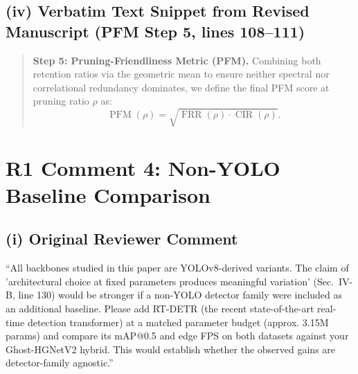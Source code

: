 \documentclass[conference]{IEEEtran}
\begin{document}
\subsection*{(iv) Verbatim Text Snippet from Revised Manuscript (PFM Step 5, lines 108--111)}
\begin{quote}
\textbf{Step 5: Pruning-Friendliness Metric (PFM).} Combining both retention ratios via the geometric mean to ensure neither spectral nor correlational redundancy dominates, we define the final PFM score at pruning ratio $\rho$ as:
\begin{equation}
\operatorname{PFM}(\rho) = \sqrt{\operatorname{FRR}(\rho) \cdot \operatorname{CIR}(\rho)}.
\end{equation}
\end{quote}
\section*{R1 Comment 4: Non-YOLO Baseline Comparison}

\subsection*{(i) Original Reviewer Comment}
``All backbones studied in this paper are YOLOv8-derived variants. The claim of 'architectural choice at fixed parameters produces meaningful variation' (Sec.~IV-B, line 130) would be stronger if a non-YOLO detector family were included as an additional baseline. Please add RT-DETR (the recent state-of-the-art real-time detection transformer) at a matched parameter budget (approx. 3.15M params) and compare its mAP@0.5 and edge FPS on both datasets against your Ghost-HGNetV2 hybrid. This would establish whether the observed gains are detector-family agnostic.''
\end{document}
